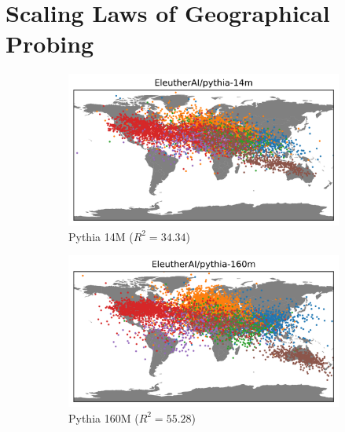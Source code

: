 \section{Scaling Laws of Geographical Probing}
\label{sec:scaling}
\begin{figure}[h]
    \centering
    \begin{subfigure}[b]{0.43\textwidth}
         \includegraphics[trim={0 0 0 0.7cm},clip,width=\linewidth]{sources/part_1/geographical/imgs/pythia-14m.png}
         \caption{Pythia 14M ($R^2 = 34.34$)}
         \label{fig:14m_map}
         \vspace{1em}
    \end{subfigure}
    \begin{subfigure}[b]{0.43\textwidth}
         \includegraphics[trim={0 0 0 0.7cm},clip,width=\linewidth]{sources/part_1/geographical/imgs/pythia-160m.png}
         \caption{Pythia 160M ($R^2 = 55.28$)}
         \label{fig:160m_map}
        \vspace{1em}
    \end{subfigure}
    \begin{subfigure}[b]{0.43\textwidth}

\end{subfigure}
\end{figure}

